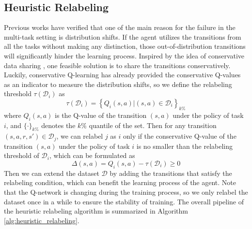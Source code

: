 \subsection{Heuristic Relabeling}

Previous works \cite{yu2021conservative} have verified that one of the main reason for the failure in the multi-task setting is distribution shifts. If the agent utilizes the transitions from all the tasks without making any distinction, those out-of-distribution transitions will significantly hinder the learning process. Inspired by the idea of conservative data sharing \cite{yu2021conservative}, one feasible solution is to share the transitions conservatively. Luckily, conservative Q-learning has already provided the conservative Q-values as an indicator to measure the distribution shifts, so we define the relabeling threshold $\tau(\mathcal{D}_i)$ as
\begin{equation}
    \tau(\mathcal{D}_i) = \left\{ Q_i(s, a) | (s, a) \in \mathcal{D}_i \right\}_{k\%}
\end{equation}
where $Q_i(s, a)$ is the Q-value of the transition $(s, a)$ under the policy of task $i$, and $\{ \cdot \}_{k\%}$ denotes the $k\%$ quantile of the set. Then for any transition $(s, a, r, s') \in \mathcal{D}_j$, we can relabel $j$ as $i$ only if the conservative Q-value of the transition $(s, a)$ under the policy of task $i$ is no smaller than the relabeling threshold of $\mathcal{D}_i$, which can be formulated as
\begin{equation}
    \Delta (s, a) = Q_i(s, a) - \tau(\mathcal{D}_i) \geq 0
\end{equation}
Then we can extend the dataset $\mathcal{D}$ by adding the transitions that satisfy the relabeling condition, which can benefit the learning process of the agent. Note that the Q-network is changing during the training process, so we only relabel the dataset once in a while to ensure the stability of training. The overall pipeline of the heuristic relabeling algorithm is summarized in Algorithm \ref{alg:heuristic_relabeling}.

